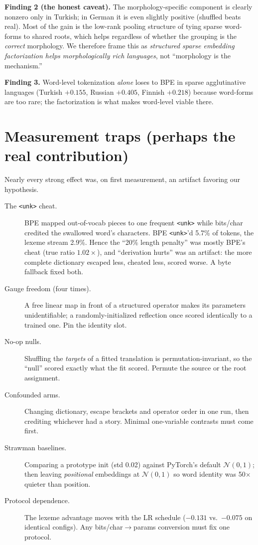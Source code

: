 \documentclass[11pt]{article}
\newcommand{\bc}{bits/char}
\begin{document}
\textbf{Finding 2 (the honest caveat).} The morphology-specific component is clearly nonzero
only in Turkish; in German it is even slightly positive (shuffled beats real). Most of the
gain is the low-rank pooling structure of tying sparse word-forms to shared roots, which
helps regardless of whether the grouping is the \emph{correct} morphology. We therefore frame
this as \emph{structured sparse embedding factorization helps morphologically rich languages},
not ``morphology is the mechanism.''

\textbf{Finding 3.} Word-level tokenization \emph{alone} loses to BPE in sparse agglutinative
languages (Turkish $+0.155$, Russian $+0.405$, Finnish $+0.218$) because word-forms are too
rare; the factorization is what makes word-level viable there.

\section{Measurement traps (perhaps the real contribution)}
\label{sec:traps}
Nearly every strong effect was, on first measurement, an artifact favoring our hypothesis.
\begin{description}
\item[The \texttt{<unk>} cheat.] BPE mapped out-of-vocab pieces to one frequent
\texttt{<unk>} while \bc{} credited the swallowed word's characters. BPE \texttt{<unk>}'d
5.7\% of tokens, the lexeme stream 2.9\%. Hence the ``20\% length penalty'' was mostly BPE's
cheat (true ratio $1.02\times$), and ``derivation hurts'' was an artifact: the more complete
dictionary escaped less, cheated less, scored worse. A byte fallback fixed both.
\item[Gauge freedom (four times).] A free linear map in front of a structured operator makes
its parameters unidentifiable; a randomly-initialized reflection once scored identically to a
trained one. Pin the identity slot.
\item[No-op nulls.] Shuffling the \emph{targets} of a fitted translation is
permutation-invariant, so the ``null'' scored exactly what the fit scored. Permute the source
or the root assignment.
\item[Confounded arms.] Changing dictionary, escape brackets and operator order in one run,
then crediting whichever had a story. Minimal one-variable contrasts must come first.
\item[Strawman baselines.] Comparing a prototype init (std 0.02) against PyTorch's default
$\mathcal{N}(0,1)$; then leaving \emph{positional} embeddings at $\mathcal{N}(0,1)$ so word
identity was 50$\times$ quieter than position.
\item[Protocol dependence.] The lexeme advantage moves with the LR schedule ($-0.131$ vs.\
$-0.075$ on identical configs). Any \bc{}$\to$params conversion must fix one protocol.
\end{description}
\end{document}
